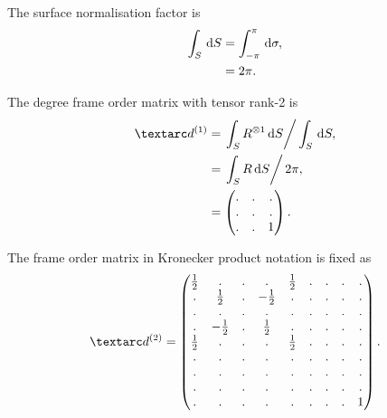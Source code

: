 The surface normalisation factor is
\begin{subequations}
\begin{align}
    \int_S \,\mathrm{d} S &= \int_{-\pi}^{\pi} \,\mathrm{d} \sigma , \\
                   &= 2\pi .
\end{align}
\end{subequations}



The  degree frame order matrix with tensor rank-2 is
\begin{subequations} \label{eq: free rotor 1st degree frame order matrix}
\begin{align}
    \FOone &= \left. \int_S R^{\otimes 1} \diff S \right / \int_S \diff S, \\
           &= \left. \int_S R \diff S \right / 2\pi, \\
           &= \begin{pmatrix}
                  . & . & . \\
                  . & . & . \\
                  . & . & 1 \\
              \end{pmatrix} .
\end{align}
\end{subequations}



The frame order matrix in Kronecker product notation is fixed as
\begin{equation} \label{eq: free rotor 2nd degree frame order matrix}
    \FOtwo =
        \begin{pmatrix}
            \half & .      & . & .      & \half & . & . & . & . \\
            .     & \half  & . & -\half & .     & . & . & . & . \\
            .     & .      & . & .      & .     & . & . & . & . \\
            .     & -\half & . & \half  & .     & . & . & . & . \\
            \half & .      & . & .      & \half & . & . & . & . \\
            .     & .      & . & .      & .     & . & . & . & . \\
            .     & .      & . & .      & .     & . & . & . & . \\
            .     & .      & . & .      & .     & . & . & . & . \\
            .     & .      & . & .      & .     & . & . & . & 1 \\
        \end{pmatrix} .
\end{equation}



